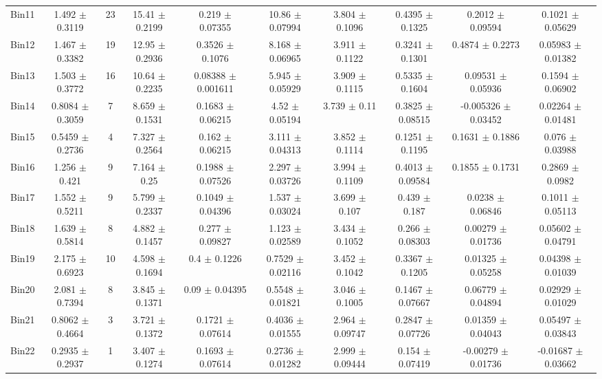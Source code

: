 \begin{tabular}{@{\extracolsep{4pt}}lccccccccc@{}}
     Bin11 & 1.492 $\pm$ 0.3119 & 23 & 15.41 $\pm$ 0.2199 & 0.219 $\pm$ 0.07355 & 10.86 $\pm$ 0.07994 & 3.804 $\pm$ 0.1096 & 0.4395 $\pm$ 0.1325 & 0.2012 $\pm$ 0.09594 & 0.1021 $\pm$ 0.05629 \\ 
     Bin12 & 1.467 $\pm$ 0.3382 & 19 & 12.95 $\pm$ 0.2936 & 0.3526 $\pm$ 0.1076 & 8.168 $\pm$ 0.06965 & 3.911 $\pm$ 0.1122 & 0.3241 $\pm$ 0.1301 & 0.4874 $\pm$ 0.2273 & 0.05983 $\pm$ 0.01382 \\ 
     Bin13 & 1.503 $\pm$ 0.3772 & 16 & 10.64 $\pm$ 0.2235 & 0.08388 $\pm$ 0.001611 & 5.945 $\pm$ 0.05929 & 3.909 $\pm$ 0.1115 & 0.5335 $\pm$ 0.1604 & 0.09531 $\pm$ 0.05936 & 0.1594 $\pm$ 0.06902 \\ 
     Bin14 & 0.8084 $\pm$ 0.3059 & 7 & 8.659 $\pm$ 0.1531 & 0.1683 $\pm$ 0.06215 & 4.52 $\pm$ 0.05194 & 3.739 $\pm$ 0.11 & 0.3825 $\pm$ 0.08515 & -0.005326 $\pm$ 0.03452 & 0.02264 $\pm$ 0.01481 \\ 
     Bin15 & 0.5459 $\pm$ 0.2736 & 4 & 7.327 $\pm$ 0.2564 & 0.162 $\pm$ 0.06215 & 3.111 $\pm$ 0.04313 & 3.852 $\pm$ 0.1114 & 0.1251 $\pm$ 0.1195 & 0.1631 $\pm$ 0.1886 & 0.076 $\pm$ 0.03988 \\ 
     Bin16 & 1.256 $\pm$ 0.421 & 9 & 7.164 $\pm$ 0.25 & 0.1988 $\pm$ 0.07526 & 2.297 $\pm$ 0.03726 & 3.994 $\pm$ 0.1109 & 0.4013 $\pm$ 0.09584 & 0.1855 $\pm$ 0.1731 & 0.2869 $\pm$ 0.0982 \\ 
     Bin17 & 1.552 $\pm$ 0.5211 & 9 & 5.799 $\pm$ 0.2337 & 0.1049 $\pm$ 0.04396 & 1.537 $\pm$ 0.03024 & 3.699 $\pm$ 0.107 & 0.439 $\pm$ 0.187 & 0.0238 $\pm$ 0.06846 & 0.1011 $\pm$ 0.05113 \\ 
     Bin18 & 1.639 $\pm$ 0.5814 & 8 & 4.882 $\pm$ 0.1457 & 0.277 $\pm$ 0.09827 & 1.123 $\pm$ 0.02589 & 3.434 $\pm$ 0.1052 & 0.266 $\pm$ 0.08303 & 0.00279 $\pm$ 0.01736 & 0.05602 $\pm$ 0.04791 \\ 
     Bin19 & 2.175 $\pm$ 0.6923 & 10 & 4.598 $\pm$ 0.1694 & 0.4 $\pm$ 0.1226 & 0.7529 $\pm$ 0.02116 & 3.452 $\pm$ 0.1042 & 0.3367 $\pm$ 0.1205 & 0.01325 $\pm$ 0.05258 & 0.04398 $\pm$ 0.01039 \\ 
     Bin20 & 2.081 $\pm$ 0.7394 & 8 & 3.845 $\pm$ 0.1371 & 0.09 $\pm$ 0.04395 & 0.5548 $\pm$ 0.01821 & 3.046 $\pm$ 0.1005 & 0.1467 $\pm$ 0.07667 & 0.06779 $\pm$ 0.04894 & 0.02929 $\pm$ 0.01029 \\ 
     Bin21 & 0.8062 $\pm$ 0.4664 & 3 & 3.721 $\pm$ 0.1372 & 0.1721 $\pm$ 0.07614 & 0.4036 $\pm$ 0.01555 & 2.964 $\pm$ 0.09747 & 0.2847 $\pm$ 0.07726 & 0.01359 $\pm$ 0.04043 & 0.05497 $\pm$ 0.03843 \\ 
     Bin22 & 0.2935 $\pm$ 0.2937 & 1 & 3.407 $\pm$ 0.1274 & 0.1693 $\pm$ 0.07614 & 0.2736 $\pm$ 0.01282 & 2.999 $\pm$ 0.09444 & 0.154 $\pm$ 0.07419 & -0.00279 $\pm$ 0.01736 & -0.01687 $\pm$ 0.03662 \\ 

\end{tabular}
